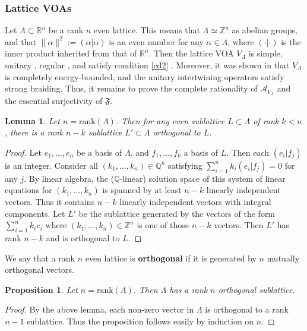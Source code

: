 \documentclass[11pt,b5paper,notitlepage]{article}
\theoremstyle{definition}
\theoremstyle{plain}
\newtheorem{pp}[df]{Proposition}
\newtheorem{lm}[df]{Lemma}
\newcommand{\fk}{\mathfrak}
\newcommand{\mc}{\mathcal}
\newcommand{\mbb}{\mathbb}
\newcommand{\rank}{\mathrm{rank}}
\numberwithin{equation}{subsection}
\begin{document}
\subsubsection*{Lattice VOAs}

Let $\Lambda\subset \mbb R^n$ be a rank $n$ even lattice. This means that $\Lambda\simeq\mbb Z^n$ as abelian groups, and that $\lVert\alpha\lVert^2:=(\alpha|\alpha)$ is an even number for any $\alpha\in\Lambda$, where  $(\cdot|\cdot)$ is the inner product inherited from that of $\mbb R^n$. Then the lattice VOA $V_\Lambda$ is simple, unitary \cite{DL14}, regular \cite{DLM97}, and satisfy condition \ref{cd2} \cite{Gui21a}. Moreover, it was shown in \cite{Gui21a} that $V_\Lambda$ is completely energy-bounded, and the unitary intertwining operators satisfy strong braiding. Thus, it remains to prove the complete rationality of $\mc A_{V_\Lambda}$ and the essential surjectivity of $\fk F$.

\begin{lm}\label{lb97}
Let $n=\rank(\Lambda)$. Then for any even sublattice $L\subset\Lambda$ of rank $k<n$, there is a rank $n-k$ sublattice $L'\subset\Lambda$ orthogonal to $L$.
\end{lm}

\begin{proof}
Let $e_1,\dots,e_n$ be a basis of $\Lambda$, and $f_1,\dots,f_k$ a basis of $L$. Then each  $(e_i|f_j)$ is an integer. Consider all $(k_1,\dots,k_n)\in\mbb Q^n$ satisfying $\sum_{i=1}^nk_i(e_i|f_j)=0$ for any $j$. By linear algebra, the ($\mbb Q$-linear) solution space of this system of linear equations for $(k_1,\dots,k_n)$ is spanned by at least $n-k$ linearly independent vectors. Thus it contains $n-k$ linearly independent vectors with integral components. Let $L'$ be the sublattice generated by the vectors of the form $\sum_{i=1}^nk_ie_i$ where $(k_1,\dots,k_n)\in\mbb Z^n$ is one of those $n-k$  vectors. Then $L'$ has rank $n-k$ and is orthogonal to $L$. 
\end{proof}

We say that a rank $n$ even lattice is \textbf{orthogonal} if it is generated by $n$ mutually orthogonal vectors.

\begin{pp}\label{lb98}
Let $n=\rank(\Lambda)$. Then $\Lambda$ has a rank $n$ orthogonal sublattice.
\end{pp}

\begin{proof}
By the above lemma, each non-zero vector in $\Lambda$ is orthogonal to a rank $n-1$ sublattice. Thus the proposition follows easily by induction on $n$.
\end{proof}
\end{document}
